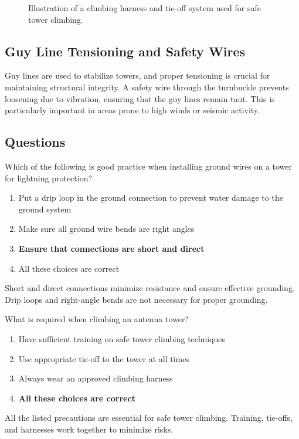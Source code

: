 \begin{figure}[h]
    \centering
    \caption{Illustration of a climbing harness and tie-off system used for safe tower climbing.}
    \label{fig:climbing_harness}
\end{figure}

\subsection*{Guy Line Tensioning and Safety Wires}
Guy lines are used to stabilize towers, and proper tensioning is crucial for maintaining structural integrity. A safety wire through the turnbuckle prevents loosening due to vibration, ensuring that the guy lines remain taut. This is particularly important in areas prone to high winds or seismic activity.

\subsection*{Questions}

\begin{tcolorbox}[colback=gray!10!white,colframe=black!75!black,title={T0B01}]
Which of the following is good practice when installing ground wires on a tower for lightning protection?
\begin{enumerate}[label=\Alph*),noitemsep]
    \item Put a drip loop in the ground connection to prevent water damage to the ground system
    \item Make sure all ground wire bends are right angles
    \item \textbf{Ensure that connections are short and direct}
    \item All these choices are correct
\end{enumerate}
\end{tcolorbox}
Short and direct connections minimize resistance and ensure effective grounding. Drip loops and right-angle bends are not necessary for proper grounding.


\begin{tcolorbox}[colback=gray!10!white,colframe=black!75!black,title={T0B02}]
What is required when climbing an antenna tower?
\begin{enumerate}[label=\Alph*),noitemsep]
    \item Have sufficient training on safe tower climbing techniques
    \item Use appropriate tie-off to the tower at all times
    \item Always wear an approved climbing harness
    \item \textbf{All these choices are correct}
\end{enumerate}
\end{tcolorbox}
All the listed precautions are essential for safe tower climbing. Training, tie-offs, and harnesses work together to minimize risks.

